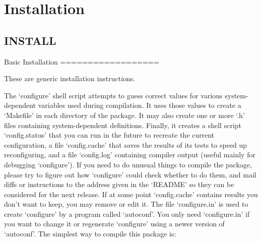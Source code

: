 \section{Installation}
\label{group__install}
\subsection{I\-N\-S\-T\-A\-L\-L}\label{group__install_install}

\begin{DoxyCodeInclude}
Basic Installation
==================

   These are \textcolor{keyword}{generic} installation instructions.

   The `configure\textcolor{stringliteral}{' shell script attempts to guess correct values for}
\textcolor{stringliteral}{various system-dependent variables used during compilation.  It uses}
\textcolor{stringliteral}{those values to create a `Makefile'} in each directory of the package.
It may also create one or more `.h\textcolor{stringliteral}{' files containing system-dependent}
\textcolor{stringliteral}{definitions.  Finally, it creates a shell script `config.status'} that
you can run in the future to recreate the current configuration, a file
`config.cache\textcolor{stringliteral}{' that saves the results of its tests to speed up}
\textcolor{stringliteral}{reconfiguring, and a file `config.log'} containing compiler output
(useful mainly \textcolor{keywordflow}{for} debugging `configure\textcolor{stringliteral}{').}
\textcolor{stringliteral}{}
\textcolor{stringliteral}{   If you need to do unusual things to compile the package, please try}
\textcolor{stringliteral}{to figure out how `configure'} could check whether to \textcolor{keywordflow}{do} them, and mail
diffs or instructions to the address given in the `README\textcolor{stringliteral}{' so they can}
\textcolor{stringliteral}{be considered for the next release.  If at some point `config.cache'}
contains results you don\textcolor{stringliteral}{'t want to keep, you may remove or edit it.}
\textcolor{stringliteral}{}
\textcolor{stringliteral}{   The file `configure.in'} is used to create `configure\textcolor{stringliteral}{' by a program}
\textcolor{stringliteral}{called `autoconf'}.  You only need `configure.in\textcolor{stringliteral}{' if you want to change}
\textcolor{stringliteral}{it or regenerate `configure'} \textcolor{keyword}{using} a newer version of `autoconf\textcolor{stringliteral}{'.}
\textcolor{stringliteral}{}
\textcolor{stringliteral}{The simplest way to compile this package is:}

\end{DoxyCodeInclude}
